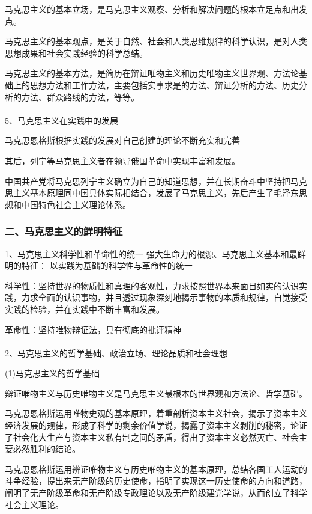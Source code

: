 \documentclass{ctexart}
\begin{document}
马克思主义的基本立场，是马克思主义观察、分析和解决问题的根本立足点和出发点。

马克思主义的基本观点，是关于自然、社会和人类思维规律的科学认识，是对人类思想成果和社会实践经验的科学总结。

马克思主义的基本方法，是简历在辩证唯物主义和历史唯物主义世界观、方法论基础上的思想方法和工作方法，主要包括实事求是的方法、辩证分析的方法、历史分析的方法、群众路线的方法，等等。
\\\\

5、马克思主义在实践中的发展

马克思恩格斯根据实践的发展对自己创建的理论不断充实和完善

其后，列宁等马克思主义者在领导俄国革命中实现丰富和发展。

中国共产党将马克思列宁主义确立为自己的知道思想，并在长期奋斗中坚持把马克思主义基本原理同中国具体实际相结合，发展了马克思主义，先后产生了毛泽东思想和中国特色社会主义理论体系。

\subsubsection{二、马克思主义的鲜明特征}
1、马克思主义科学性和革命性的统一
强大生命力的根源、马克思主义基本和最鲜明的特征：
以实践为基础的科学性与革命性的统一

科学性：坚持世界的物质性和真理的客观性，力求按照世界本来面目如实的认识实践，力求全面的认识事物，并且透过现象深刻地揭示事物的本质和规律，自觉接受实践的检验，并在实践中不断丰富和发展。

革命性：坚持唯物辩证法，具有彻底的批评精神
\\\\

2、马克思主义的哲学基础、政治立场、理论品质和社会理想

(1)马克思主义的哲学基础

辩证唯物主义与历史唯物主义是马克思主义最根本的世界观和方法论、哲学基础。

马克思恩格斯运用唯物史观的基本原理，着重剖析资本主义社会，揭示了资本主义经济发展的规律，形成了科学的剩余价值学说，揭露了资本主义剥削的秘密，论证了社会化大生产与资本主义私有制之间的矛盾，得出了资本主义必然灭亡、社会主要必然胜利的结论。

马克思恩格斯运用辨证唯物主义与历史唯物主义的基本原理，总结各国工人运动的斗争经验，提出来无产阶级的历史使命，指明了实现这一历史使命的方向和道路，阐明了无产阶级革命和无产阶级专政理论以及无产阶级建党学说，从而创立了科学社会主义理论。
\end{document}
